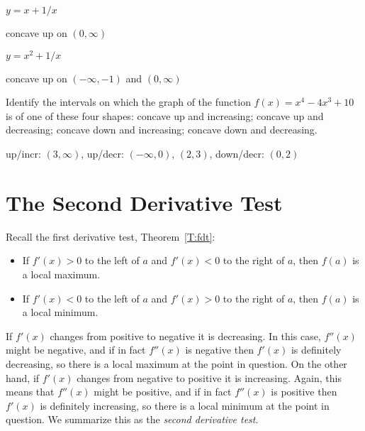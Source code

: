 \begin{exercises}
\begin{exercise} $y = x+ 1/x$
\begin{answer} concave up on $(0,\infty)$
\end{answer}\end{exercise}

\begin{exercise} $y = x^2+ 1/x$
\begin{answer} concave up on $(-\infty,-1)$ and $(0,\infty)$
\end{answer}\end{exercise}

\endtwocol

\begin{exercise} Identify the intervals on which the graph of the
  function $f(x) = x^4-4x^3 +10$ is of one of these four shapes:
  concave up and increasing; concave up and decreasing; concave down
  and increasing; concave down and decreasing.
\begin{answer} up/incr: $(3,\infty)$, up/decr: $(-\infty,0)$, $(2,3)$,
down/decr: $(0,2)$
\end{answer}\end{exercise}


\end{exercises}








\section{The Second Derivative Test}


Recall the first derivative test, Theorem~\ref{T:fdt}:
\begin{itemize}
\item If $f'(x)>0$ to the left of $a$ and $f'(x)<0$ to the right of
  $a$, then $f(a)$ is a local maximum.
\item If $f'(x)<0$ to the left of $a$ and $f'(x)>0$ to the right of
  $a$, then $f(a)$ is a local minimum.
\end{itemize}

If $f'(x)$ changes from positive to negative it is decreasing. In this
case, $f''(x)$ might be negative, and if in fact $f''(x)$ is negative
then $f'(x)$ is definitely decreasing, so there is a local maximum at
the point in question. On the other hand, if $f'(x)$ changes from
negative to positive it is increasing. Again, this means that
$f''(x)$ might be positive, and if in fact $f''(x)$ is positive then
$f'(x)$ is definitely increasing, so there is a local minimum at the
point in question. We summarize this as the \textit{second derivative
  test}.


